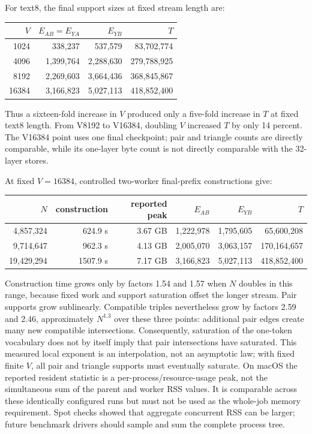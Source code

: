 \documentclass[11pt]{article}
\begin{document}
For text8, the final support sizes at fixed stream length are:
\begin{center}
\begin{tabular}{rrrr}
\toprule
$V$ & $E_{AB}=E_{YA}$ & $E_{YB}$ & $T$ \\
\midrule
1024  & 338,237   & 537,579   & 83,702,774 \\
4096  & 1,399,764 & 2,288,630 & 279,788,925 \\
8192  & 2,269,603 & 3,664,436 & 368,845,867 \\
16384 & 3,166,823 & 5,027,113 & 418,852,400 \\
\bottomrule
\end{tabular}
\end{center}
Thus a sixteen-fold increase in $V$ produced only a five-fold increase in
$T$ at fixed text8 length.  From V8192 to V16384, doubling $V$ increased $T$
by only 14 percent.  The V16384 point uses one final checkpoint; pair and
triangle counts are directly comparable, while its one-layer byte count is
not directly comparable with the 32-layer stores.

At fixed $V=16384$, controlled two-worker final-prefix constructions give:
\begin{center}
\begin{tabular}{rrrrrr}
\toprule
$N$ & construction & reported peak & $E_{AB}$ & $E_{YB}$ & $T$ \\
\midrule
4,857,324  & 624.9 s  & 3.67 GB & 1,222,978 & 1,795,605 & 65,600,208 \\
9,714,647  & 962.3 s  & 4.13 GB & 2,005,070 & 3,063,157 & 170,164,657 \\
19,429,294 & 1507.9 s & 7.17 GB & 3,166,823 & 5,027,113 & 418,852,400 \\
\bottomrule
\end{tabular}
\end{center}
Construction time grows only by factors 1.54 and 1.57 when $N$ doubles in
this range, because fixed work and support saturation offset the longer
stream.  Pair supports grow sublinearly.  Compatible triples nevertheless
grow by factors 2.59 and 2.46, approximately $N^{1.3}$ over these three
points: additional pair edges create many new compatible intersections.
Consequently, saturation of the one-token vocabulary does not by itself
imply that pair intersections have saturated.  This measured local exponent
is an interpolation, not an asymptotic law; with fixed finite $V$, all pair
and triangle supports must eventually saturate.
On macOS the reported resident statistic is a per-process/resource-usage
peak, not the simultaneous sum of the parent and worker RSS values.  It is
comparable across these identically configured runs but must not be used as
the whole-job memory requirement.  Spot checks showed that aggregate
concurrent RSS can be larger; future benchmark drivers should sample and sum
the complete process tree.
\end{document}
